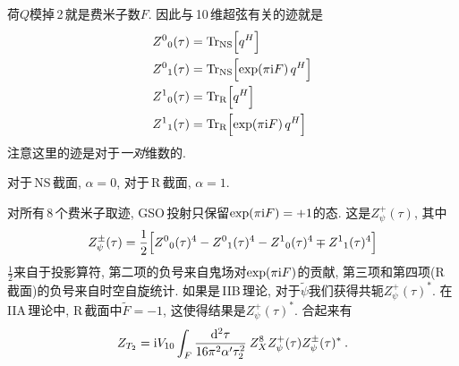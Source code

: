 荷$ Q $模掉\,2\,就是费米子数$ F$. 因此与\,10\,维超弦有关的迹就是
\begin{subequations}
    \begin{align}
        Z^{0}{}_{0}(\tau) &= \operatorname{Tr}_{\text{NS}} \Bigl[ q^{H}\Bigr] \label{10.7.8a} \\
        Z^{0}{}_{1}(\tau) &= \operatorname{Tr}_{\text{NS}} \Bigl[ \exp(\pi\mathrm{i} F)\, q^{H}\Bigr] \label{10.7.8b} \\
        Z^{1}{}_{0}(\tau) &= \operatorname{Tr}_{\text{R}} \Bigl[ q^{H}\Bigr] \label{10.7.8c} \\
        Z^{1}{}_{1}(\tau) &= \operatorname{Tr}_{\text{R}} \Bigl[ \exp(\pi\mathrm{i} F)\, q^{H}\Bigr] \label{10.7.8d}
    \end{align} \label{10.7.8}
\end{subequations}
注意这里的迹是对于{\emph{一对}}维数的.
\begin{tcolorbox}
\noindent 对于\,NS\,截面, $\alpha=0$, 对于\,R\,截面, $\alpha=1$.
\end{tcolorbox}

对所有\,8\,个费米子取迹, GSO\,投射只保留$ \exp(\pi\mathrm{i} F)=+1 $的态. 这是$ Z_{\psi}^{+}(\tau)$, 其中
\begin{equation}
    Z_{\psi}^{\pm}(\tau) = \frac{1}{2} \Bigl[Z^{0}{}_{0}(\tau)^{4}-Z^{0}{}_{1}(\tau)^{4}-Z^{1}{}_{0}(\tau)^{4}\mp Z^{1}{}_{1}(\tau)^{4} \Bigr] \label{10.7.9}
\end{equation}
$\frac{1}{2} $来自于投影算符, 第二项的负号来自鬼场对$\exp(\pi\mathrm{i} F)$的贡献, 第三项和第四项(R\,截面)的负号来自时空自旋统计. 如果是\,IIB\,理论, 对于$ \tilde{\psi} $我们获得共轭$ Z_{\psi}^{+}(\tau)^{\ast}$. 在\,IIA\,理论中, R\,截面中$ \tilde{F}=-1$, 这使得结果是$ Z_{\psi}^{+}(\tau)^{\ast}$. 合起来有
\begin{equation}
    Z_{T_{2}} = \mathrm{i} V_{10} \int_{F}\frac{\mathrm{d}^{2}\tau}{16\pi^{2}\alpha^{\prime}\tau_{2}^{2}}\:Z_{X}^{8}Z_{\psi}^{+}(\tau)Z_{\psi}^{\pm}(\tau)^{\ast} \:. \label{10.7.10}
\end{equation}

